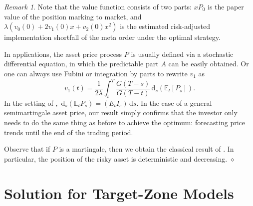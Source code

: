 \documentclass[11pt]{article}
\theoremstyle{definition}
\theoremstyle{remark}
\newtheorem{rem}[thm]{Remark}
\newcommand{\E}{\mathbb{E}} %
\newcommand{\close}{\hspace*{\fill}$\diamond$}
\newcommand{\de}{\,\mathrm{d}}
\begin{document}
\begin{rem}
Note that the value function consists of two parts: $xP_0$ is the paper value of the position marking to market, and $\lambda(v_0(0)+2v_1(0)x+v_2(0)x^2)$ is the estimated risk-adjusted implementation shortfall of the meta order under the optimal strategy.

In applications, the asset price process $P$ is usually defined via a stochastic differential equation, in which the predictable part $A$ can be easily obtained. Or one can always use Fubini or integration by parts to rewrite $v_1$ as $$v_1(t)= \frac{1}{2\lambda}\int_t^T \frac{G(T-s)}{G(T-t)} \de_s\left(\E_t[P_s]\right).$$
In the setting of \cite{lehalle2017incorporating}, $\de_s(\E_t P_s) = (E_t I_s)\de s$. In the case of a general semimartingale asset price, our result simply confirms that the investor only needs to do the same thing as before to achieve the optimum: forecasting price trends until the end of the trading period. %

Observe that if $P$ is a martingale, then we obtain the classical result of \cite{almgren2001optimal}. In particular, the position of the risky asset is deterministic and decreasing.%
\close
\end{rem}



\section{Solution for Target-Zone Models}\label{s:cap}
\end{document}
